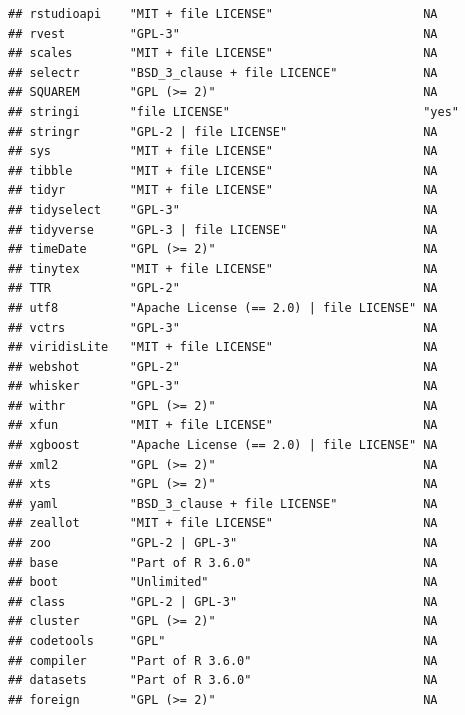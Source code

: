 \documentclass[]{article}
\begin{document}
\begin{verbatim}
## rstudioapi    "MIT + file LICENSE"                     NA             
## rvest         "GPL-3"                                  NA             
## scales        "MIT + file LICENSE"                     NA             
## selectr       "BSD_3_clause + file LICENCE"            NA             
## SQUAREM       "GPL (>= 2)"                             NA             
## stringi       "file LICENSE"                           "yes"          
## stringr       "GPL-2 | file LICENSE"                   NA             
## sys           "MIT + file LICENSE"                     NA             
## tibble        "MIT + file LICENSE"                     NA             
## tidyr         "MIT + file LICENSE"                     NA             
## tidyselect    "GPL-3"                                  NA             
## tidyverse     "GPL-3 | file LICENSE"                   NA             
## timeDate      "GPL (>= 2)"                             NA             
## tinytex       "MIT + file LICENSE"                     NA             
## TTR           "GPL-2"                                  NA             
## utf8          "Apache License (== 2.0) | file LICENSE" NA             
## vctrs         "GPL-3"                                  NA             
## viridisLite   "MIT + file LICENSE"                     NA             
## webshot       "GPL-2"                                  NA             
## whisker       "GPL-3"                                  NA             
## withr         "GPL (>= 2)"                             NA             
## xfun          "MIT + file LICENSE"                     NA             
## xgboost       "Apache License (== 2.0) | file LICENSE" NA             
## xml2          "GPL (>= 2)"                             NA             
## xts           "GPL (>= 2)"                             NA             
## yaml          "BSD_3_clause + file LICENSE"            NA             
## zeallot       "MIT + file LICENSE"                     NA             
## zoo           "GPL-2 | GPL-3"                          NA             
## base          "Part of R 3.6.0"                        NA             
## boot          "Unlimited"                              NA             
## class         "GPL-2 | GPL-3"                          NA             
## cluster       "GPL (>= 2)"                             NA             
## codetools     "GPL"                                    NA             
## compiler      "Part of R 3.6.0"                        NA             
## datasets      "Part of R 3.6.0"                        NA             
## foreign       "GPL (>= 2)"                             NA             

\end{verbatim}
\end{document}
